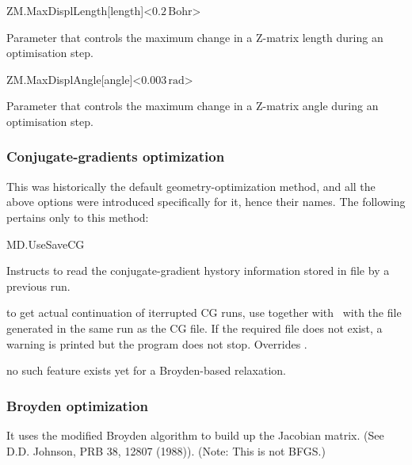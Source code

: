 \begin{fdfentry}{ZM.MaxDisplLength}[length]<$0.2\,\mathrm{Bohr}$>
  
  Parameter that controls the maximum change in a Z-matrix length
  during an optimisation step.

\end{fdfentry}

\begin{fdfentry}{ZM.MaxDisplAngle}[angle]<$0.003\,\mathrm{rad}$>
  
  Parameter that controls the maximum change in a Z-matrix angle
  during an optimisation step.

\end{fdfentry}



\subsubsection{Conjugate-gradients optimization}

This was historically the default geometry-optimization method, and
all the above options were introduced specifically for it, hence their
names. The following pertains only to this method:

\begin{fdflogicalF}{MD.UseSaveCG}

  Instructs to read the conjugate-gradient hystory information stored
  in file  by a previous run.

  \note to get actual continuation of iterrupted CG runs, use
  together with  \fdftrue\ with the 
  file generated in the same run as the CG file.  If the required file
  does not exist, a warning is printed but the program does not
  stop. Overrides .

  \note no such feature exists yet for a Broyden-based relaxation.

\end{fdflogicalF}

\subsubsection{Broyden optimization}

It uses the modified Broyden algorithm to
build up the Jacobian matrix. (See D.D. Johnson, PRB 38, 12807
(1988)). (Note: This is not BFGS.)

